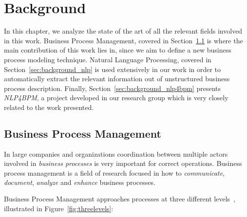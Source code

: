 \chapter{Background}
\label{cha:background}

In this chapter, we analyze the state of the art of all the relevant fields
involved in this work. Business Process Management, covered in
Section~\ref{sec:background_bpm} is where the main contribution of this work
lies in, since we aim to define a new business process modeling technique.
Natural Language Processing, covered in Section~\ref{sec:background_nlp} is used
extensively in our work in order to automatically extract the relevant
information out of unstructured business process description. Finally,
Section~\ref{sec:background_nlp4bpm} presents \emph{NLP4BPM}, a project
developed in our research group which is very closely related to the work
presented.




\section{Business Process Management}
\label{sec:background_bpm}


In large companies and organizations coordination between multiple actors
involved in \textit{business processes} is very important for correct
operations. Business process management is a field of research focused in how to  
\textit{communicate}, \textit{document}, \textit{analyze} and \textit{enhance}
business processes.

Business Process Management approaches processes at three different
levels~\cite{mendling2017challenges}, illustrated in Figure~\ref{fig:threelevels}:

